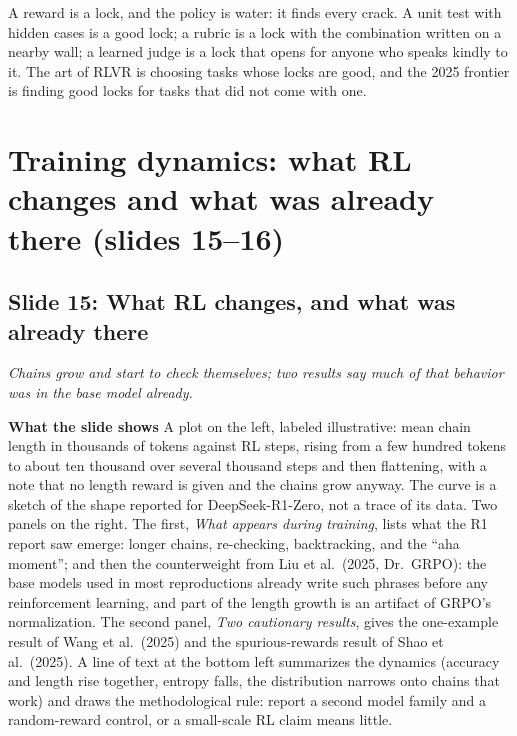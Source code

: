 \documentclass[11pt,letterpaper]{article}
\newcommand{\setstage}[1]{\colorlet{stagec}{#1}}
\newcommand{\slide}[3]{%
  \subsection[Slide #1: #2]{Slide #1: #2}%
  {\color{muted}\itshape #3\par}\medskip}
\newcommand{\para}[1]{\medskip\noindent\textbf{#1}\quad}
\newenvironment{intuition}{\begin{tcolorbox}[intuitionbox]}{\end{tcolorbox}}
\begin{document}
\begin{intuition}
A reward is a lock, and the policy is water: it finds every crack. A unit test with hidden cases is a good lock; a rubric is a lock with the combination written on a nearby wall; a learned judge is a lock that opens for anyone who speaks kindly to it. The art of RLVR is choosing tasks whose locks are good, and the 2025 frontier is finding good locks for tasks that did not come with one.
\end{intuition}
\setstage{mlp}
\section{Training dynamics: what RL changes and what was already there (slides 15--16)}

\slide{15}{What RL changes, and what was already there}{Chains grow and start to check themselves; two results say much of that behavior was in the base model already.}

\para{What the slide shows} A plot on the left, labeled illustrative: mean chain length in thousands of tokens against RL steps, rising from a few hundred tokens to about ten thousand over several thousand steps and then flattening, with a note that no length reward is given and the chains grow anyway. The curve is a sketch of the shape reported for DeepSeek-R1-Zero, not a trace of its data. Two panels on the right. The first, \emph{What appears during training}, lists what the R1 report saw emerge: longer chains, re-checking, backtracking, and the ``aha moment''; and then the counterweight from Liu et al.\ (2025, Dr.\ GRPO): the base models used in most reproductions already write such phrases before any reinforcement learning, and part of the length growth is an artifact of GRPO's normalization. The second panel, \emph{Two cautionary results}, gives the one-example result of Wang et al.\ (2025) and the spurious-rewards result of Shao et al.\ (2025). A line of text at the bottom left summarizes the dynamics (accuracy and length rise together, entropy falls, the distribution narrows onto chains that work) and draws the methodological rule: report a second model family and a random-reward control, or a small-scale RL claim means little.
\end{document}
